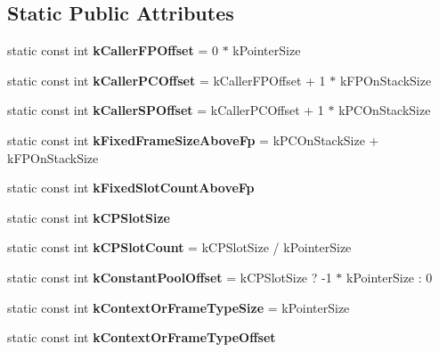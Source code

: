 \subsection*{Static Public Attributes}
\begin{DoxyCompactItemize}
\item 
static const int {\bfseries k\+Caller\+F\+P\+Offset} = 0 $\ast$ k\+Pointer\+Size\hypertarget{classv8_1_1internal_1_1_common_frame_constants_ade56e1f0b44c43ab94f7b62aa1d88a7d}{}\label{classv8_1_1internal_1_1_common_frame_constants_ade56e1f0b44c43ab94f7b62aa1d88a7d}

\item 
static const int {\bfseries k\+Caller\+P\+C\+Offset} = k\+Caller\+F\+P\+Offset + 1 $\ast$ k\+F\+P\+On\+Stack\+Size\hypertarget{classv8_1_1internal_1_1_common_frame_constants_ae45e6c3e8b87ecbd2ad2488d6e3b6229}{}\label{classv8_1_1internal_1_1_common_frame_constants_ae45e6c3e8b87ecbd2ad2488d6e3b6229}

\item 
static const int {\bfseries k\+Caller\+S\+P\+Offset} = k\+Caller\+P\+C\+Offset + 1 $\ast$ k\+P\+C\+On\+Stack\+Size\hypertarget{classv8_1_1internal_1_1_common_frame_constants_adbbeb56a795f1f92fbf3160c2c4cdbe2}{}\label{classv8_1_1internal_1_1_common_frame_constants_adbbeb56a795f1f92fbf3160c2c4cdbe2}

\item 
static const int {\bfseries k\+Fixed\+Frame\+Size\+Above\+Fp} = k\+P\+C\+On\+Stack\+Size + k\+F\+P\+On\+Stack\+Size\hypertarget{classv8_1_1internal_1_1_common_frame_constants_a9b5dcc7092f82cd9b78a0dee2a6ec12c}{}\label{classv8_1_1internal_1_1_common_frame_constants_a9b5dcc7092f82cd9b78a0dee2a6ec12c}

\item 
static const int {\bfseries k\+Fixed\+Slot\+Count\+Above\+Fp}
\item 
static const int {\bfseries k\+C\+P\+Slot\+Size}
\item 
static const int {\bfseries k\+C\+P\+Slot\+Count} = k\+C\+P\+Slot\+Size / k\+Pointer\+Size\hypertarget{classv8_1_1internal_1_1_common_frame_constants_aef1d05230e499d342a2fdf9f08bb3329}{}\label{classv8_1_1internal_1_1_common_frame_constants_aef1d05230e499d342a2fdf9f08bb3329}

\item 
static const int {\bfseries k\+Constant\+Pool\+Offset} = k\+C\+P\+Slot\+Size ? -\/1 $\ast$ k\+Pointer\+Size \+: 0\hypertarget{classv8_1_1internal_1_1_common_frame_constants_a94d8479ead717d20e42cc5ae72f209ca}{}\label{classv8_1_1internal_1_1_common_frame_constants_a94d8479ead717d20e42cc5ae72f209ca}

\item 
static const int {\bfseries k\+Context\+Or\+Frame\+Type\+Size} = k\+Pointer\+Size\hypertarget{classv8_1_1internal_1_1_common_frame_constants_ad3b7fe510b1c6247528ac1d9afd32f56}{}\label{classv8_1_1internal_1_1_common_frame_constants_ad3b7fe510b1c6247528ac1d9afd32f56}

\item 
static const int {\bfseries k\+Context\+Or\+Frame\+Type\+Offset}
\end{DoxyCompactItemize}



